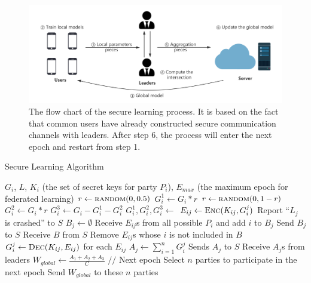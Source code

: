 \begin{figure}[!ht]
    \centering
    \includegraphics[width=2\columnwidth]{img/alg.png}
    \caption{The flow chart of the secure learning process. It is based on the fact that common users have already constructed secure communication channels with leaders. After step 6, the process will enter the next epoch and restart from step 1.}
    \label{fig-alg}
\end{figure}

\begin{algorithm}
    \label{sec-learning}
    \caption{Secure Learning Algorithm}
    \begin{algorithmic}[1] 
        \Require $G_i$, $L$, $K_i$ (the set of secret keys for party $P_i$), $E_{max}$ (the maximum epoch for federated learning)
            \State $r \gets \Call{random}{0, 0.5}$
            \State $G_i^1 \gets G_i * r$
            \State $r \gets \Call{random}{0, 1-r}$
            \State $G_i^2 \gets G_i * r$
            \State $G_i^3 \gets G_i - G_i^1 - G_i^2$
            \State {}
        \EndFunction
        \State
            \State $G_i^1, G_i^2, G_i^3 \gets$ 
                \State $E_{ij} \gets \Call{Enc}{K_{ij}, G_i^j}$
                    \State Report ``$L_j$ is crashed'' to $S$
                \EndIf
            \EndFor
        \EndFunction
        \State
            \State $B_j \gets \emptyset$
            \State Receive $E_{ij}$s from all possible $P_i$ and add $i$ to $B_j$
            \State Send $B_j$ to $S$
            \State Receive $B$ from $S$
            \State Remove $E_{ij}$s whose $i$ is not included in $B$
            \State $G_i^j \gets \Call{Dec}{K_{ij}, E_{ij}}$ for each $E_{ij}$
            \State $A_j \gets \sum_{i=1}^nG_i^j$
            \State Sends $A_j$ to $S$
        \EndFunction
        \State
                \State {}
            \EndIf
            \State Receive $A_j$s from leaders
            \State $W_{global} \gets \frac{A_1 + A_2 + A_3}{C} $
            \State {} 
            \State $//$ Next epoch
            \State Select $n$ parties to participate in the next epoch
            \State Send $W_{global}$ to these $n$ parties
            \State {}
        \EndFunction
    \end{algorithmic}
\end{algorithm}


